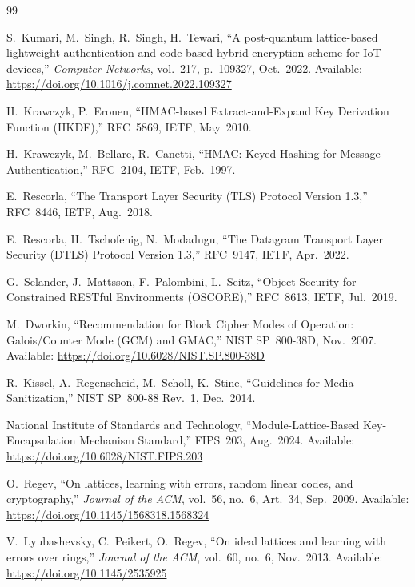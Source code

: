 \documentclass[conference]{IEEEtran}
\begin{document}
\begin{thebibliography}{99}

S.~Kumari, M.~Singh, R.~Singh, H.~Tewari,
``A post-quantum lattice-based lightweight authentication and code-based
hybrid encryption scheme for {IoT} devices,''
\textit{Computer Networks}, vol.~217, p.~109327, Oct.~2022.
Available: \url{https://doi.org/10.1016/j.comnet.2022.109327}

H.~Krawczyk, P.~Eronen,
``{HMAC}-based Extract-and-Expand Key Derivation Function ({HKDF}),''
RFC~5869, IETF, May~2010.

H.~Krawczyk, M.~Bellare, R.~Canetti,
``{HMAC}: Keyed-Hashing for Message Authentication,''
RFC~2104, IETF, Feb.~1997.

E.~Rescorla,
``The Transport Layer Security ({TLS}) Protocol Version 1.3,''
RFC~8446, IETF, Aug.~2018.

E.~Rescorla, H.~Tschofenig, N.~Modadugu,
``The Datagram Transport Layer Security ({DTLS}) Protocol Version 1.3,''
RFC~9147, IETF, Apr.~2022.

G.~Selander, J.~Mattsson, F.~Palombini, L.~Seitz,
``Object Security for Constrained {RESTful} Environments ({OSCORE}),''
RFC~8613, IETF, Jul.~2019.

M.~Dworkin,
``Recommendation for Block Cipher Modes of Operation: {Galois/Counter Mode
(GCM)} and {GMAC},''
NIST SP~800-38D, Nov.~2007.
Available: \url{https://doi.org/10.6028/NIST.SP.800-38D}

R.~Kissel, A.~Regenscheid, M.~Scholl, K.~Stine,
``Guidelines for Media Sanitization,''
NIST SP~800-88 Rev.~1, Dec.~2014.

{National Institute of Standards and Technology},
``Module-Lattice-Based Key-Encapsulation Mechanism Standard,''
FIPS~203, Aug.~2024.
Available: \url{https://doi.org/10.6028/NIST.FIPS.203}

O.~Regev,
``On lattices, learning with errors, random linear codes, and
cryptography,''
\textit{Journal of the ACM}, vol.~56, no.~6, Art.~34, Sep.~2009.
Available: \url{https://doi.org/10.1145/1568318.1568324}

V.~Lyubashevsky, C.~Peikert, O.~Regev,
``On ideal lattices and learning with errors over rings,''
\textit{Journal of the ACM}, vol.~60, no.~6, Nov.~2013.
Available: \url{https://doi.org/10.1145/2535925}


\end{thebibliography}
\end{document}
